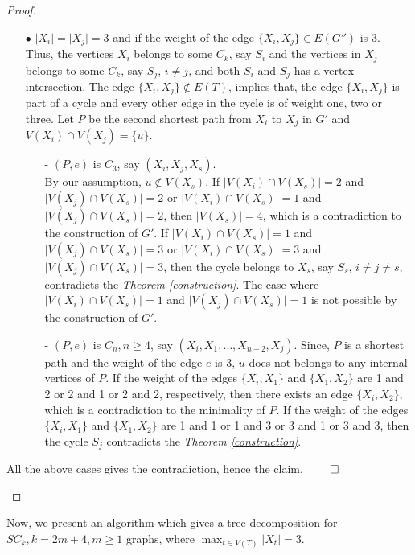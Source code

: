 \documentclass[runningheads]{llncs}
\begin{document}
\begin{proof}
\begin{description}
\begin{itemize}
\item[$\bullet$] $\vert X_i \vert = \vert X_j \vert = 3$ and if the weight of the edge $\{X_i, X_j\} \in E(G'')$ is 3. Thus, the vertices $X_i$ belongs to some $C_k$, say $S_i$ and the vertices in $X_j$ belongs to some $C_k$, say $S_j$, $i \neq j$, and both $S_i$ and $S_j$ has a vertex intersection. The edge $\{X_i, X_j\} \notin E(T)$, implies that, the edge $\{X_i, X_j\}$ is part of a cycle and every other edge in the cycle is of weight one, two or three. Let $P$ be the second shortest path from $X_i$ to $X_j$ in $G'$ and $V(X_i) \cap V(X_j) = \{u\}$.

\begin{itemize}
\item[-] $(P,e)$ is $C_3$, say $(X_i,X_j,X_s)$. \\ By our assumption, $u \notin V(X_s)$. If $\vert V(X_i) \cap V(X_s)\vert = 2$ and $\vert V(X_j) \cap V(X_s)\vert = 2$ or $\vert V(X_i) \cap V(X_s)\vert = 1$ and $\vert V(X_j) \cap V(X_s)\vert = 2$, then $\vert  V(X_s)\vert = 4$, which is a contradiction to the construction of $G'$. If $\vert V(X_i) \cap V(X_s)\vert = 1$ and $\vert V(X_j) \cap V(X_s)\vert = 3$ or $\vert V(X_i) \cap V(X_s)\vert = 3$ and $\vert V(X_j) \cap V(X_s)\vert = 3$, then the cycle belongs to $X_s$, say $S_s$, $i \neq j \neq s$, contradicts the \emph{Theorem \ref{construction}}. The case where $\vert V(X_i) \cap V(X_s)\vert = 1$ and $\vert V(X_j) \cap V(X_s)\vert = 1$ is not possible by the construction of $G'$. 


\item[-] $(P,e)$ is $C_n, n \geq 4$, say $(X_i,X_{1},\ldots, X_{n-2},X_j)$. Since, $P$ is a shortest path and the weight of the edge $e$ is 3, $u$ does not belongs to any internal vertices of $P$. If the weight of the edges $\{X_i,X_1\}$ and $\{X_1,X_2\}$ are 1 and 2 or 2 and 1 or 2 and 2, respectively, then there exists an edge $\{X_i,X_2\}$, which is a contradiction to the minimality of $P$. If the weight of the edges $\{X_i,X_1\}$ and $\{X_1,X_2\}$ are 1 and 1 or 1 and 3 or 3 and 1 or 3 and 3, then the cycle $S_j$ contradicts the \emph{Theorem \ref{construction}}. 
\end{itemize}
\end{itemize}

All the above cases gives the contradiction, hence the claim. $\hfill \qed$

\end{description}
\end{proof}


\noindent Now, we present an algorithm which gives a tree decomposition for $SC_k, k =2m+4, m \geq 1$ graphs, where $\max_{t \in V(T)} \vert X_t \vert = 3$.\\
\end{document}
